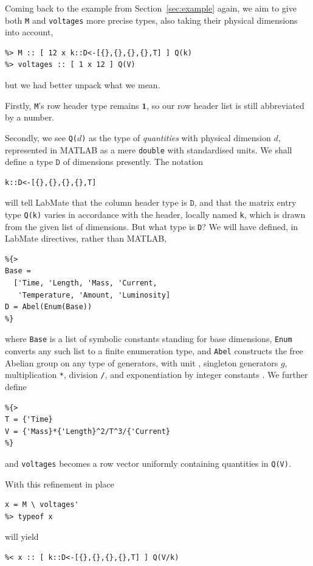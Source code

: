 \documentclass{IMEKO2024}
\newcommand{\lcb}{\texttt{\symbol{123}}}
\newcommand{\rcb}{\texttt{\symbol{125}}}
\newcommand{\crt}{\texttt{\symbol{94}}}
\newcommand{\One}{\mathbf{1}}
\newcommand{\remph}{\emph}
\begin{document}

Coming back to the example from Section~\ref{sec:example} again, we aim to give both \texttt{M} and \texttt{voltages} more precise types, also taking their physical dimensions into account,
\begin{verbatim}
%> M :: [ 12 x k::D<-[{},{},{},{},T] ] Q(k)
%> voltages :: [ 1 x 12 ] Q(V)
\end{verbatim}
  but we had better unpack what we mean.

Firstly, \texttt{M}'s row header type remains $\One$, so our row header list is still abbreviated by a number.

Secondly, we see \texttt{Q(}$d$\texttt{)} as the type of \remph{quantities} with physical dimension $d$, represented in MATLAB as a mere \texttt{double} with standardised units. We shall define a type $\texttt{D}$ of dimensions presently. The notation
\begin{verbatim}
k::D<-[{},{},{},{},T]
\end{verbatim}
will tell LabMate that the column header type is $\texttt{D}$, and that the matrix entry type \texttt{Q(k)} varies in accordance with the header, locally named \texttt{k}, which is drawn from the given list of dimensions.
%
But what type is \texttt{D}? We will have defined, in LabMate directives, rather than MATLAB,
\begin{verbatim}
%{>
Base =
  ['Time, 'Length, 'Mass, 'Current,
   'Temperature, 'Amount, 'Luminosity]
D = Abel(Enum(Base))
%}
\end{verbatim}
where \texttt{Base} is a list of symbolic constants standing for base dimensions, \texttt{Enum} converts any such list to a finite enumeration type, and \texttt{Abel} constructs the free Abelian group on any type of generators, with unit \lcb\rcb, singleton generators \lcb$g$\rcb, multiplication \texttt{*}, division \texttt{/}, and exponentiation by integer constants \crt. We further define
\begin{verbatim}
%{>
T = {'Time}
V = {'Mass}*{'Length}^2/T^3/{'Current}
%}
\end{verbatim}
and \texttt{voltages} becomes a row vector uniformly containing quantities in \texttt{Q(V)}.

With this refinement in place
\begin{verbatim}
x = M \ voltages'
%> typeof x
\end{verbatim}
will yield
\begin{verbatim}
%< x :: [ k::D<-[{},{},{},{},T] ] Q(V/k)
\end{verbatim}
\end{document}
